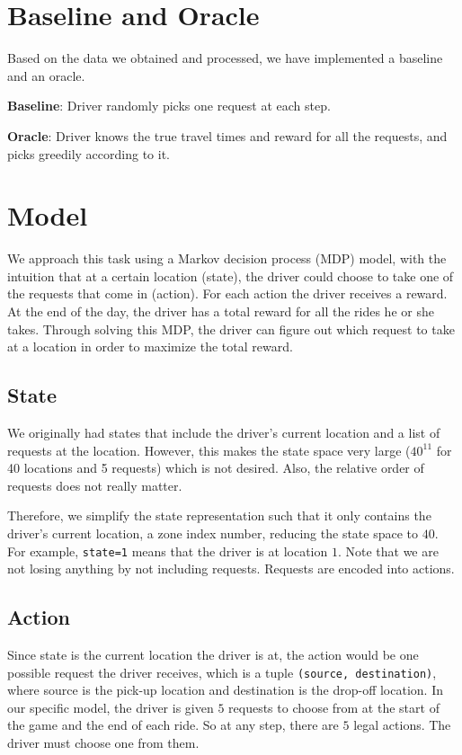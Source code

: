 \documentclass{article}
\begin{document}
\section{Baseline and Oracle}

Based on the data we obtained and processed, we have implemented a baseline and an oracle.

\textbf{Baseline}: Driver randomly picks one request at each step.

\textbf{Oracle}: Driver knows the true travel times and reward for all the requests, and picks greedily according to it.

\section{Model}
We approach this task using a Markov decision process (MDP) model, with the intuition that at a certain location (state), the driver could choose to take one of the requests that come in (action). For each action the driver receives a reward. At the end of the day, the driver has a total reward for all the rides he or she takes. Through solving this MDP, the driver can figure out which request to take at a location in order to maximize the total reward.

\subsection{State}
We originally had states that include the driver's current location and a list of requests at the location. However, this makes the state space very large ($40^{11}$ for 40 locations and 5 requests) which is not desired. Also, the relative order of requests does not really matter.

Therefore, we simplify the state representation such that it only contains the driver's current location, a zone index number, reducing the state space to $40$. For example, \texttt{state=1} means that the driver is at location $1$. Note that we are not losing anything by not including requests. Requests are encoded into actions.

\subsection{Action}
Since state is the current location the driver is at, the action would be one possible request the driver receives, which is a tuple \texttt{(source, destination)}, where source is the pick-up location and destination is the drop-off location. In our specific model, the driver is given $5$ requests to choose from at the start of the game and the end of each ride. So at any step, there are $5$ legal actions. The driver must choose one from them.
\end{document}
